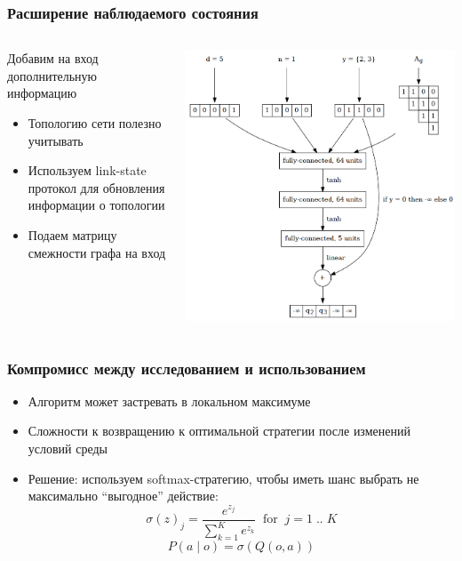 \documentclass{beamer}
\begin{document}
\begin{frame}
  \frametitle{Расширение наблюдаемого состояния}
  \begin{columns}
    \begin{column}{0.5\textwidth}
      Добавим на вход дополнительную информацию
      \begin{itemize}
      \item Топологию сети полезно учитывать
      \item Используем link-state протокол для обновления информации о топологии
      \item Подаем матрицу смежности графа на вход
      \end{itemize}
    \end{column}
    \begin{column}{0.5\textwidth}
      \begin{center}
        \includegraphics[width=\textwidth]{nn-2}
      \end{center}
    \end{column}
  \end{columns}
\end{frame}


\begin{frame}
  \frametitle{Компромисс между исследованием и использованием}
  \begin{itemize}
  \item Алгоритм может застревать в локальном максимуме
  \item Сложности к возвращению к оптимальной стратегии после изменений условий среды
  \item Решение: используем softmax-стратегию, чтобы иметь шанс выбрать не максимально ``выгодное'' действие:
    \[
    \sigma(z)_j = \frac{e^{z_j}}{\sum_{k=1}^K {e^{z_k}}} \; \; \mathrm{for} \; \; j
    = 1 \; .. \; K
    \]
    \[
    P(a \; | \; o) = \sigma(Q(o, a)) 
    \]
  \end{itemize}
\end{frame}
\end{document}
